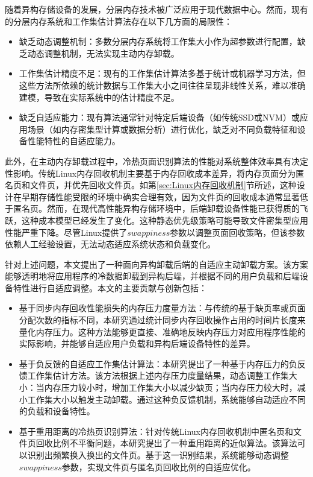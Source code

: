 随着异构存储设备的发展，分层内存技术被广泛应用于现代数据中心。然而，现有的分层内存系统和工作集估计算法存在以下几方面的局限性：

\begin{itemize}
    \item 缺乏动态调整机制：多数分层内存系统将工作集大小作为超参数进行配置，缺乏动态调整机制，无法实现主动内存卸载。
    \item 工作集估计精度不足：现有的工作集估计算法多基于统计或机器学习方法，但这些方法所依赖的统计数据与工作集大小之间往往呈现非线性关系，难以准确建模，导致在实际系统中的估计精度不足。
    \item 缺乏自适应能力：现有算法通常针对特定后端设备（如传统SSD或NVM）或应用场景（如内存密集型计算或数据分析）进行优化，缺乏对不同负载特征和设备性能特性的自适应能力。
\end{itemize}


此外，在主动内存卸载过程中，冷热页面识别算法的性能对系统整体效率具有决定性影响。传统Linux内存回收机制主要基于内存回收成本差异，将内存页面分为匿名页和文件页，并优先回收文件页。如第\ref{sec:Linux内存回收机制}节所述，这种设计在早期存储性能受限的环境中确实合理有效，因为文件页的回收成本通常显著低于匿名页。然而，在现代高性能异构存储环境中，后端卸载设备性能已获得质的飞跃，这种成本模型已经发生了变化。这种静态优先级策略可能导致文件密集型应用性能严重下降。尽管Linux提供了\(swappiness\)参数以调整页面回收策略，但该参数依赖人工经验设置，无法动态适应系统状态和负载变化。

针对上述问题，本文提出了一种面向异构卸载后端的自适应主动卸载方案。该方案能够透明地将应用程序的冷数据卸载到异构后端，并根据不同的用户负载和后端设备特性进行自适应调整。本文的主要贡献与创新包括：

\begin{itemize}
    \item 基于同步内存回收性能损失的内存压力度量方法：与传统的基于缺页率或页面分配次数的指标不同，本研究通过统计同步内存回收操作占用的时间片长度来量化内存压力。这种方法能够更直接、准确地反映内存压力对应用程序性能的实际影响，并能够自适应用户负载和异构后端设备特性的差异。
    \item 基于负反馈的自适应工作集估计算法：本研究提出了一种基于内存压力的负反馈工作集估计方法。该方法根据上述内存压力度量结果，动态调整工作集大小：当内存压力较小时，增加工作集大小以减少缺页；当内存压力较大时，减小工作集大小以触发主动卸载。通过这种负反馈机制，系统能够自动适应不同的负载和设备特性。
    \item 基于重用距离的冷热页识别算法：针对传统Linux内存回收机制中匿名页和文件页回收比例不平衡问题，本研究提出了一种重用距离的近似算法。该算法可以识别出频繁换入换出的文件页。基于这一识别结果，系统能够动态调整\(swappiness\)参数，实现文件页与匿名页回收比例的自适应优化。
\end{itemize}

